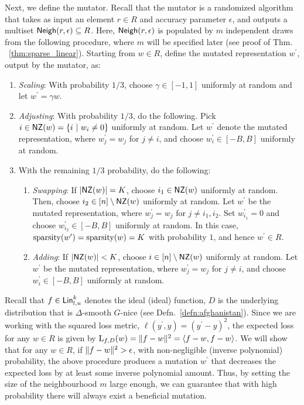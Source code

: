 Next, we define the mutator. Recall that the mutator is a randomized algorithm
that takes as input an element $r \in R$ and accuracy parameter $\epsilon$, and
outputs a multiset $\mathsf{Neigh}(r, \epsilon) \subseteq R$. Here, $\mathsf{Neigh}(r,
\epsilon)$ is populated by $m$ independent draws from the following procedure,
where $m$ will be specified later (see proof of Thm. ~\ref{thm:sparse_linear}).
Starting from $w \in R$, define the mutated representation $w^\prime$, output by
the mutator, as:
\begin{enumerate}
%
\item {\em Scaling}: With probability $1/3$, choose $\gamma \in [-1, 1]$ uniformly at
random and let $w^\prime = \gamma w$. 
%
\item {\em Adjusting}: With probability $1/3$, do the following.  Pick $i \in
\mathsf{NZ}(w) = \{ i~|~ w_i \neq 0 \}$ uniformly at random. Let $w^\prime$ denote the
mutated representation, where $w^\prime_j = w_j$ for $j \neq i$, and choose
$w^\prime_i \in [-B, B]$ uniformly at random.
%
\item With the remaining $1/3$ probability, do the following:
\begin{enumerate}
\item {\em Swapping}: If $|\mathsf{NZ}(w)| = K$, choose $i_1 \in \mathsf{NZ}(w)$ uniformly at random.
Then, choose $i_2 \in [n] \setminus \mathsf{NZ}(w)$ uniformly at random. Let $w^\prime$
be the mutated representation, where $w_j^\prime = w_j$ for $j \neq i_1, i_2$.
Set $w_{i_1}^\prime = 0$ and choose $w_{i_2}^\prime \in [-B, B]$ uniformly at
random. In this case, $\mathrm{sparsity}(w^\prime) = \mathrm{sparsity}(w) = K$
with probability $1$, and hence $w^\prime \in R$.
\item {\em Adding}: If $|\mathsf{NZ}(w)| < K$, choose $i \in [n] \setminus \mathsf{NZ}(w)$ uniformly
at random. Let $w^\prime$ be the mutated representation, where $w_j^\prime =
w_j$ for $j \neq i$, and choose $w^\prime_i \in [-B, B]$ uniformly at random.
\end{enumerate}
\end{enumerate}

Recall that $f \in \mathsf{Lin}^k_{l, u}$ denotes the ideal (ideal) function, $D$ is the
underlying distribution that is $\Delta$-smooth $G$-nice (see
Defn.~\ref{defn:afghanistan}). Since we are working with the squared loss
metric, $\ell(y^\prime, y) = (y^\prime - y)^2$, the expected loss for any $w \in
R$ is given by $\mathrm{L}_{f, D}(w) = \Vert f - w \Vert^2 = \langle f - w, f - w \rangle$.  We
will show that for any $w \in R$, if $\Vert f - w \Vert^2 > \epsilon$, with
non-negligible (inverse polynomial) probability, the above procedure produces a
mutation $w^\prime$ that decreases the expected loss by at least some inverse
polynomial amount. Thus, by setting the size of the neighbourhood $m$ large
enough, we can guarantee that with high probability there will always exist a
beneficial mutation.
%

